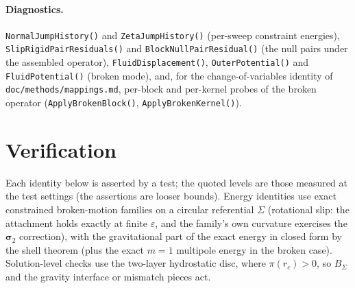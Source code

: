 \documentclass[11pt]{article}
\newcommand{\eps}{\varepsilon}
\begin{document}
\paragraph{Diagnostics.} \texttt{NormalJumpHistory()} and
\texttt{ZetaJumpHistory()} (per-sweep constraint energies),
\texttt{SlipRigidPairResiduals()} and \texttt{BlockNullPairResidual()}
(the null pairs under the assembled operator),
\texttt{FluidDisplacement()}, \texttt{OuterPotential()} and
\texttt{FluidPotential()} (broken mode), and, for the change-of-variables
identity of \texttt{doc/methods/mappings.md}, per-block and per-kernel probes of
the broken operator (\texttt{ApplyBrokenBlock()},
\texttt{ApplyBrokenKernel()}).

\section{Verification}
\label{sec:verif}

Each identity below is asserted by a test; the quoted levels are those
measured at the test settings (the assertions are looser bounds).
Energy identities use exact constrained broken-motion families on a
circular referential $\Sigma$ (rotational slip: the attachment holds
exactly at finite $\eps$, and the family's own curvature exercises the
$\bm{\sigma}_2$ correction), with the gravitational part of the exact
energy in closed form by the shell theorem (plus the exact $m = 1$
multipole energy in the broken case). Solution-level checks use the
two-layer hydrostatic disc, where $\pi(r_c) > 0$, so $B_\Sigma$ and the
gravity interface or mismatch pieces act.
\end{document}
